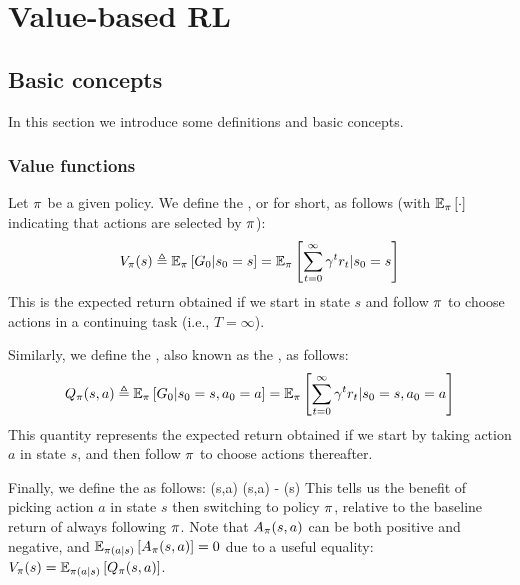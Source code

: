 \chapter{Value-based RL}
\label{sec:RLvalue}
\label{sec:valueBased}
\label{sec:valueRL}

\section{Basic concepts}

In this section we introduce some definitions and basic concepts.

\subsection{Value functions}
\label{sec:valueFn}

Let $\policy$ be a given policy.  We define the ,
or  for short,
as follows (with $\expectQ{\cdot}{\policy}$ indicating that actions are selected by $\policy$):
\begin{align}
\Vpol(s)
\defeq \expectQ{\return_0 | s_0=s}{\policy}
=\expectQ{\sum_{t=0}^{\infty} \gamma^t r_{t} | s_0=s}{\policy}
\label{eqn:Vfn}
\end{align}
This is the expected return obtained if we start in state $s$ and follow $\policy$ to choose actions
in a continuing task (i.e., $T=\infty$).

Similarly, we define 
the ,
also known as the ,
as follows:
\begin{align}
\Qpol(s,a)
\defeq \expectQ{\return_0 | s_0=s,a_0=a}{\policy}
=\expectQ{\sum_{t=0}^{\infty} \gamma^t r_{t} | s_0=s,a_0=a}{\policy}
\label{eqn:Qfn}
\end{align}
This quantity represents the expected return obtained
if we start by taking action $a$ in state $s$,
and then follow $\policy$ to choose actions thereafter.

Finally, we define the  as follows:
\be
\Apol(s,a)  \Qpol(s,a)  - \Vpol(s)
\ee
This tells us the benefit of picking action $a$
in state $s$ then switching to policy $\policy$, relative to the baseline return of always following $\policy$.
Note that $\Apol(s,a)$ can be both positive and negative, and $\expectQ{\Apol(s,a)}{\policy(a|s)}=0$
due to a useful equality:
$\Vpol(s) = \expectQ{\Qpol(s,a)}{\policy(a|s)}$.


